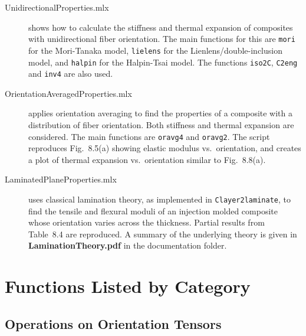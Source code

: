 \documentclass[11pt]{article}
\begin{document}
\begin{description}

    \item[UnidirectionalProperties.mlx]{shows how to calculate the stiffness and thermal expansion of composites with unidirectional fiber orientation.  The main functions for this are \texttt{mori} for the Mori-Tanaka model, \texttt{lielens} for the Lienlens/double-inclusion model, and \texttt{halpin} for the Halpin-Tsai model.  The functions \texttt{iso2C}, \texttt{C2eng} and \texttt{inv4} are also used.}
    
    \item[OrientationAveragedProperties.mlx]{applies orientation averaging to find the properties of a composite with a distribution of fiber orientation.  Both stiffness and thermal expansion are considered.  The main functions are \texttt{oravg4} and \texttt{oravg2}.  The script reproduces Fig.~8.5(a) showing elastic modulus vs.\ orientation, and creates a plot of thermal expansion vs.\ orientation similar to Fig.~8.8(a).}
        
    \item[LaminatedPlaneProperties.mlx]{uses classical lamination theory, as implemented in \texttt{Clayer2laminate}, to find the tensile and flexural moduli of an injection molded composite whose orientation varies across the thickness.  Partial results from Table~8.4 are reproduced.  A summary of the underlying theory is given in \textbf{LaminationTheory.pdf} in the documentation folder.}
\end{description}

\section{Functions Listed by Category}

\subsection{Operations on Orientation Tensors}
\end{document}
